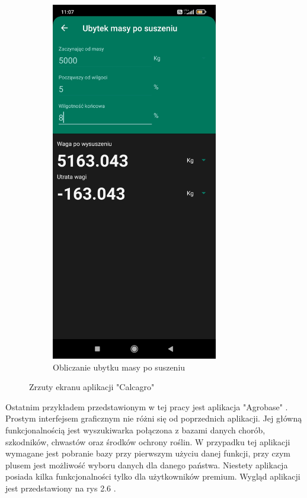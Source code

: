 \documentclass[a4paper,12pt,oneside]{book}
\begin{document}
\begin{figure}[H]
\begin{subfigure}{.5\textwidth}
			\includegraphics[width=0.8\textwidth]{grafika/calc_1.jpg}
			\caption{Obliczanie ubytku masy po suszeniu}
		\end{subfigure}
		\caption{Zrzuty ekranu aplikacji "Calcagro"}
	\end{figure}
	
	Ostatnim przykładem przedstawionym w tej pracy jest aplikacja "Agrobase" \cite{ref8}. Prostym interfejsem graficznym nie różni się od poprzednich aplikacji. Jej główną funkcjonalnością jest wyszukiwarka połączona z bazami danych chorób, szkodników, chwastów oraz środków ochrony roślin. W przypadku tej aplikacji wymagane jest pobranie bazy przy pierwszym użyciu danej funkcji, przy czym plusem jest możliwość wyboru danych dla danego państwa. Niestety aplikacja posiada kilka funkcjonalności tylko dla użytkowników premium. Wygląd aplikacji jest przedstawiony na rys 2.6 .
	
\end{document}
